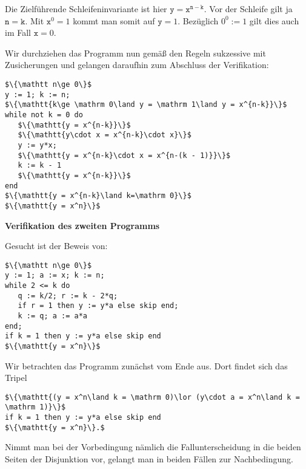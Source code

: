 \documentclass[8pt,fleqn,aspectratio=169]{beamer}
\newcommand{\strong}[1]{\textsf{\textbf{#1}}}
\newcommand{\centerheadline}[1]{%
  \begin{center}\strong{#1}\end{center}}
\newcommand{\parspace}{\vspace{0.8em}}
\newcommand{\code}[1]{{\texttt{#1}}}
\begin{document}
\begin{frame}[fragile]
Die Zielführende Schleifeninvariante ist hier $\mathtt{y =
x^{n-k}}$. Vor der Schleife gilt ja $\mathtt{n=k}$.
Mit $\mathtt{x}^0 = 1$ kommt man somit auf $\mathtt y = 1$.
{\footnotesize Bezüglich $0^0:=1$ gilt dies auch im Fall $\code{x}=0$.}\pause{}

\parspace
Wir durchziehen das Programm nun gemäß den Regeln sukzessive mit
Zusicherungen und gelangen daraufhin zum Abschluss der Verifikation:
\begin{lstlisting}[language=IMP, xleftmargin=\mathindent, mathescape]
$\{\mathtt n\ge 0\}$
y := 1; k := n;
$\{\mathtt{k\ge \mathrm 0\land y = \mathrm 1\land y = x^{n-k}}\}$
while not k = 0 do
   $\{\mathtt{y = x^{n-k}}\}$
   $\{\mathtt{y\cdot x = x^{n-k}\cdot x}\}$
   y := y*x;
   $\{\mathtt{y = x^{n-k}\cdot x = x^{n-(k - 1)}}\}$
   k := k - 1
   $\{\mathtt{y = x^{n-k}}\}$
end
$\{\mathtt{y = x^{n-k}\land k=\mathrm 0}\}$
$\{\mathtt{y = x^n}\}$
\end{lstlisting}
\end{frame}

\begin{frame}
\centerheadline{Verifikation des zweiten Programms}
\end{frame}

\begin{frame}[fragile]
Gesucht ist der Beweis von:
\begin{lstlisting}[language=IMP, xleftmargin=\mathindent, mathescape]
$\{\mathtt n\ge 0\}$
y := 1; a := x; k := n;
while 2 <= k do
   q := k/2; r := k - 2*q;
   if r = 1 then y := y*a else skip end;
   k := q; a := a*a
end;
if k = 1 then y := y*a else skip end
$\{\mathtt{y = x^n}\}$
\end{lstlisting}\pause

Wir betrachten das Programm zunächst vom Ende aus. Dort findet sich das Tripel
\begin{lstlisting}[language=IMP, xleftmargin=\mathindent, mathescape]
$\{\mathtt{(y = x^n\land k = \mathrm 0)\lor (y\cdot a = x^n\land k = \mathrm 1)}\}$
if k = 1 then y := y*a else skip end
$\{\mathtt{y = x^n}\}.$
\end{lstlisting}
Nimmt man bei der Vorbedingung nämlich die Fallunterscheidung in die
beiden Seiten der Disjunktion vor, gelangt man in beiden Fällen
zur Nachbedingung.
\end{frame}
\end{document}
